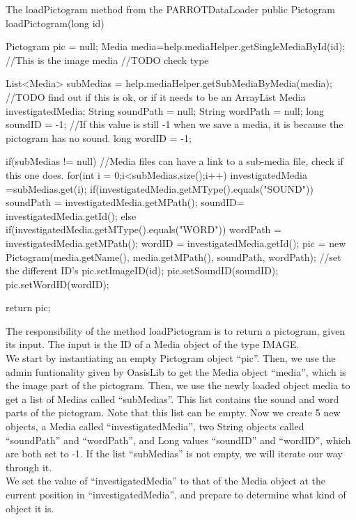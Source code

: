 \begin{source}[{lp}]{The loadPictogram method from the PARROTDataLoader}
	public Pictogram loadPictogram(long id)
	{
		Pictogram pic = null;
		Media media=help.mediaHelper.getSingleMediaById(id); //This is the image media //TODO check type

		List<Media> subMedias =	help.mediaHelper.getSubMediaByMedia(media); //TODO find out if this is ok, or if it needs to be an ArrayList
		Media investigatedMedia;
		String soundPath = null;
		String wordPath = null;
		long soundID = -1; //If this value is still -1 when we save a media, it is because the pictogram has no sound.
		long wordID = -1;

		if(subMedias != null)	//Media files can have a link to a sub-media file, check if this one does.
		{
			for(int i = 0;i<subMedias.size();i++) 		
			{
				investigatedMedia =subMedias.get(i);
				if(investigatedMedia.getMType().equals("SOUND"))
				{
					soundPath = investigatedMedia.getMPath();
					soundID= investigatedMedia.getId();
				}
				else if(investigatedMedia.getMType().equals("WORD"))
				{
					wordPath = investigatedMedia.getMPath();
					wordID = investigatedMedia.getId();
				}
			}
		}
		pic = new Pictogram(media.getName(), media.getMPath(), soundPath, wordPath);
		//set the different ID's
		pic.setImageID(id);
		pic.setSoundID(soundID);
		pic.setWordID(wordID);

		return pic;
	}

\end{source}
The responsibility of the method loadPictogram is to return a pictogram, given its input. The input is the ID of a Media object of the type IMAGE.\\
We start by instantiating an empty Pictogram object ``pic''.\newline
Then, we use the admin funtionality given by OasisLib to get the Media object ``media'', which is the image part of the pictogram.
Then, we use the newly loaded object media to get a list of Medias called ``subMedias''.
This list contains the sound and word parts of the pictogram.
Note that this list can be empty.\newline
Now we create 5 new objects, a Media called ``investigatedMedia'', two String objects called ``soundPath'' and ``wordPath'', and Long values ``soundID'' and ``wordID'', which are both set to -1.
If the list ``subMedias'' is not empty, we will iterate our way through it.\\
We set the value of ``investigatedMedia'' to that of the Media object at the current position in ``investigatedMedia'', and prepare to determine what kind of object it is.
